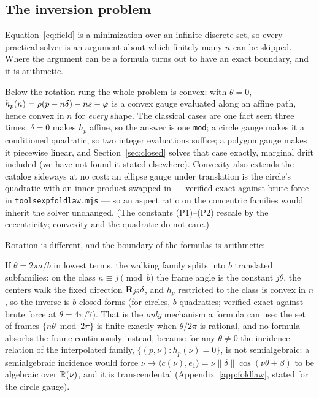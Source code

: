 \subsection{The inversion problem}
\label{sec:inversion}

Equation~\eqref{eq:field} is a minimization over an infinite discrete set, so
every practical solver is an argument about which finitely many $n$ can be
skipped. Where the argument can be a formula turns out to have an exact
boundary, and it is arithmetic.

Below the rotation rung the whole problem is convex: with $\theta=0$,
$h_p(n)=\rho(p-n\delta)-ns-\varphi$ is a convex gauge evaluated along an
affine path, hence convex in $n$ for \emph{every} shape. The classical cases
are one fact seen three times. $\delta=0$ makes $h_p$ affine, so the answer is
one \texttt{mod}; a circle gauge makes it a conditioned quadratic, so two
integer evaluations suffice; a polygon gauge makes it piecewise linear, and
Section~\ref{sec:closed} solves that case exactly, marginal drift included
(we have not found it stated elsewhere). Convexity also extends the catalog
sideways at no cost: an ellipse gauge under translation is the circle's
quadratic with an inner product swapped in --- verified exact against brute
force in \texttt{tools\pslash exp\pslash foldlaw.mjs} --- so an aspect ratio
on the concentric families would inherit the solver unchanged. (The
constants (P1)--(P2) rescale by the eccentricity; convexity and the
quadratic do not care.)

Rotation is different, and the boundary of the formulas is arithmetic:

\begin{proposition}
\label{prop:untwist}
If $\theta=2\pi a/b$ in lowest terms, the walking family splits into $b$
translated subfamilies: on the class $n\equiv j\pmod b$ the frame angle is
the constant $j\theta$, the centers walk the fixed direction
$\mathbf{R}_{j\theta}\delta$, and $h_p$ restricted to the class is convex in $n$, so
the inverse is $b$ closed forms (for circles, $b$ quadratics; verified exact
against brute force at $\theta=4\pi/7$). That is the \emph{only} mechanism a
formula can use: the set of frames $\{n\theta \bmod 2\pi\}$ is finite exactly
when $\theta/2\pi$ is rational, and no formula absorbs the frame continuously
instead, because for any $\theta\neq0$ the incidence relation of the
interpolated family, $\{(p,\nu):h_p(\nu)=0\}$, is not semialgebraic: a
semialgebraic incidence would force
$\nu\mapsto\langle c(\nu),e_1\rangle=\nu\lVert\delta\rVert\cos(\nu\theta+\beta)$
to be algebraic over $\mathbb{R}(\nu)$, and it is transcendental
(Appendix~\ref{app:foldlaw}, stated for the circle gauge).
\end{proposition}

